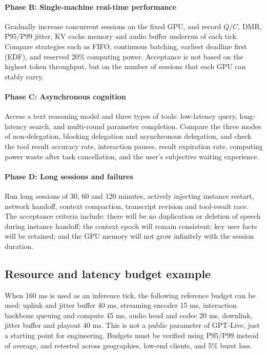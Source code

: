 \documentclass[UTF8,fontset=none,a4paper,10pt]{ctexart}
\begin{document}
\paragraph{Phase B: Single-machine real-time performance}
Gradually increase concurrent sessions on the fixed GPU, and record $Q/C$, DMR, P95/P99 jitter, KV cache memory and audio buffer underrun of each tick. Compare strategies such as FIFO, continuous batching, earliest deadline first (EDF), and reserved 20\% computing power. Acceptance is not based on the highest token throughput, but on the number of sessions that each GPU can stably carry.

\paragraph{Phase C: Asynchronous cognition}
Access a text reasoning model and three types of tools: low-latency query, long-latency search, and multi-round parameter completion. Compare the three modes of non-delegation, blocking delegation and asynchronous delegation, and check the tool result accuracy rate, interaction pauses, result expiration rate, computing power waste after task cancellation, and the user's subjective waiting experience.

\paragraph{Phase D: Long sessions and failures}
Run long sessions of 30, 60 and 120 minutes, actively injecting instance restart, network handoff, context compaction, transcript revision and tool-result race. The acceptance criteria include: there will be no duplication or deletion of speech during instance handoff; the context epoch will remain consistent; key user facts will be retained; and the GPU memory will not grow infinitely with the session duration.

\subsection{Resource and latency budget example}

When 160 ms is used as an inference tick, the following reference budget can be used: uplink and jitter buffer 40 ms, streaming encoder 15 ms, interaction backbone queuing and compute 45 ms, audio head and codec 20 ms, downlink, jitter buffer and playout 40 ms. This is not a public parameter of GPT-Live, just a starting point for engineering. Budgets must be verified using P95/P99 instead of average, and retested across geographies, low-end clients, and 5\% burst loss.
\end{document}
